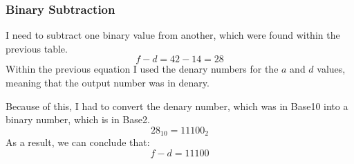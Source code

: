 \documentclass[a4paper,12pt]{article}
\begin{document}
\subsubsection{Binary Subtraction}
I need to subtract one binary value from another, which were found within the previous table.
\[
  f - d = 42 - 14 = 28
\]
Within the previous equation I used the denary numbers for the $a$ and $d$ values, meaning that the output number was in denary.

Because of this, I had to convert the denary number, which was in Base10 into a binary number, which is in Base2.
\[
  28_{10} = 11100_{2}
\]
As a result, we can conclude that:
\[
  f - d = 11100
\]
\end{document}

